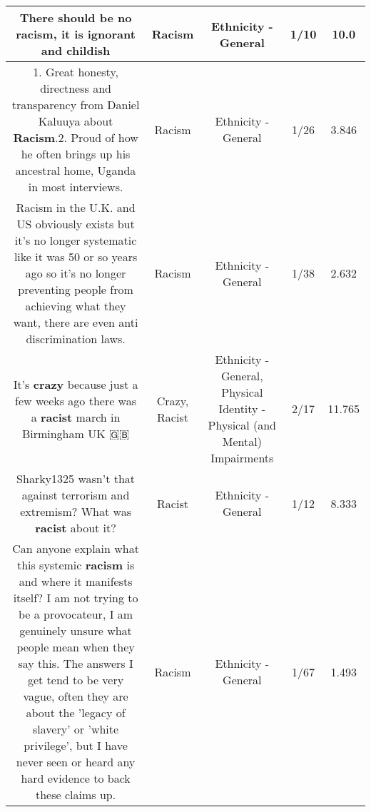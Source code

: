 \documentclass[11pt]{article}
\newlength\mylength
\begin{document}
\begin{center}
\begin{longtable}{|C{.65\mylength}|C{.30\mylength}|C{.12\mylength}|C{.12\mylength}|C{.12\mylength}|}
  \small There should be no \textbf{racism}, it is ignorant and childish\normalsize   & Racism & Ethnicity - General & 1/10 & 10.0 \\  \hline
  \small 1. Great honesty, directness and transparency from Daniel Kaluuya about \textbf{Racism}.2. Proud of how he often brings up his ancestral home, Uganda in most interviews.\normalsize   & Racism & Ethnicity - General & 1/26 & 3.846 \\  \hline
  \small Racism in the U.K. and US obviously exists but it's no longer systematic like it was 50 or so years ago so it's no longer preventing people from achieving what they want, there are even anti discrimination laws.\normalsize   & Racism & Ethnicity - General & 1/38 & 2.632 \\  \hline
  \small It's \textbf{crazy} because just a few weeks ago there was a \textbf{racist} march in Birmingham UK 🇬🇧\normalsize   & Crazy, Racist & Ethnicity - General, Physical Identity - Physical (and Mental) Impairments & 2/17 & 11.765 \\  \hline
  \small Sharky1325 wasn't that against terrorism and extremism? What was \textbf{racist} about it?\normalsize   & Racist & Ethnicity - General & 1/12 & 8.333 \\  \hline
  \small Can anyone explain what this systemic \textbf{racism} is and where it manifests itself? I am not trying to be a provocateur, I am genuinely unsure what people mean when they say this. The answers I get tend to be very vague, often they are about the 'legacy of slavery' or 'white privilege', but I have never seen or heard any hard evidence to back these claims up.\normalsize   & Racism & Ethnicity - General & 1/67 & 1.493 \\  \hline

\end{longtable}
\end{center}
\end{document}
